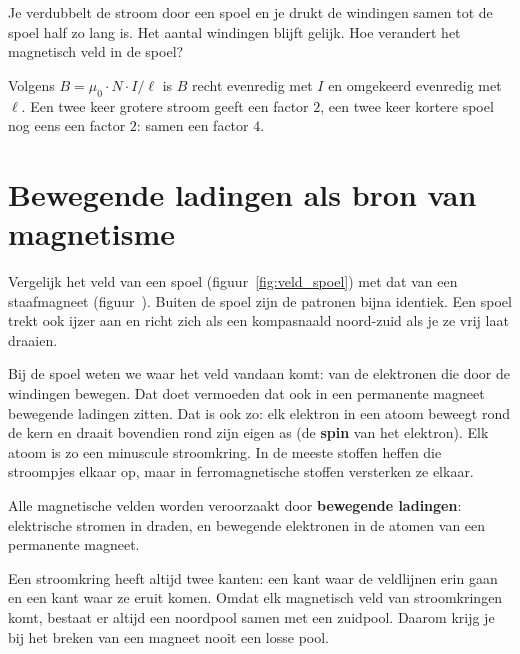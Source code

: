 \documentclass{ximera}
\begin{document}
\begin{question}
    Je verdubbelt de stroom door een spoel en je drukt de windingen samen tot de spoel half zo lang is. Het aantal windingen blijft gelijk. Hoe verandert het magnetisch veld in de spoel?

    \begin{multipleChoice}
    \end{multipleChoice}

    \begin{solution}\nl
        Volgens $B = \mu_0 \cdot N \cdot I/\ell$ is $B$ recht evenredig met $I$ en omgekeerd evenredig met $\ell$. Een twee keer grotere stroom geeft een factor $2$, een twee keer kortere spoel nog eens een factor $2$: samen een factor $4$.
    \end{solution}
\end{question}

\section{Bewegende ladingen als bron van magnetisme}\label{sec:bron-magnetisme}
Vergelijk het veld van een spoel (figuur~\ref{fig:veld_spoel}) met dat van een staafmagneet (figuur~). Buiten de spoel zijn de patronen bijna identiek. Een spoel trekt ook ijzer aan en richt zich als een kompasnaald noord-zuid als je ze vrij laat draaien.

Bij de spoel weten we waar het veld vandaan komt: van de elektronen die door de windingen bewegen. Dat doet vermoeden dat ook in een permanente magneet bewegende ladingen zitten. Dat is ook zo: elk elektron in een atoom beweegt rond de kern en draait bovendien rond zijn eigen as (de \textbf{spin} van het elektron). Elk atoom is zo een minuscule stroomkring. In de meeste stoffen heffen die stroompjes elkaar op, maar in ferromagnetische stoffen versterken ze elkaar.

\begin{proposition}[foldable=true,title={Bron van magnetisme}]\nl
    Alle magnetische velden worden veroorzaakt door \textbf{bewegende ladingen}: elektrische stromen in draden, en bewegende elektronen in de atomen van een permanente magneet.
\end{proposition}

\begin{remark}[expandable=true,title={Waarom geen afzonderlijke polen?}]\nl
    Een stroomkring heeft altijd twee kanten: een kant waar de veldlijnen erin gaan en een kant waar ze eruit komen. Omdat elk magnetisch veld van stroomkringen komt, bestaat er altijd een noordpool samen met een zuidpool. Daarom krijg je bij het breken van een magneet nooit een losse pool.
\end{remark}
\end{document}
